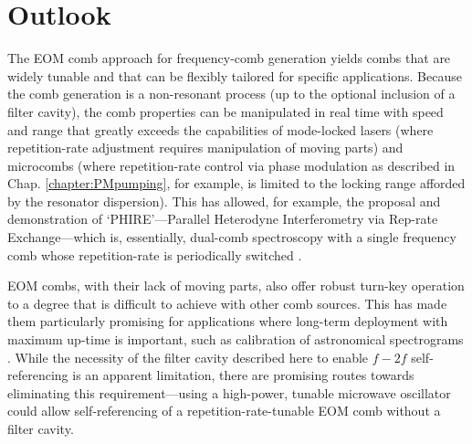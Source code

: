 \section{Outlook}
The EOM comb approach for frequency-comb generation yields combs that are widely tunable and that can be flexibly tailored for specific applications. Because the comb generation is a non-resonant process (up to the optional inclusion of a filter cavity), the comb properties can be manipulated in real time with speed and range that greatly exceeds the capabilities of mode-locked lasers (where repetition-rate adjustment requires manipulation of moving parts) and microcombs (where repetition-rate control via phase modulation as described in Chap. \ref{chapter:PMpumping}, for example, is limited to the locking range afforded by the resonator dispersion). This has allowed, for example, the proposal and demonstration of `PHIRE'---Parallel Heterodyne Interferometry via Rep-rate Exchange---which is, essentially, dual-comb spectroscopy \cite{Coddington2016}  with a single frequency comb whose repetition-rate is periodically switched \cite{Carlson2018}. 

EOM combs, with their lack of moving parts, also offer robust turn-key operation to a degree that is difficult to achieve with other comb sources. This has made them particularly promising for applications where long-term deployment with maximum up-time is important, such as calibration of astronomical spectrograms \cite{Metcalf2018} . While the necessity of the filter cavity described here to enable $f-2f$ self-referencing is an apparent limitation, there are promising routes towards eliminating this requirement---using a high-power, tunable microwave oscillator could allow self-referencing of a repetition-rate-tunable EOM comb without a filter cavity.

